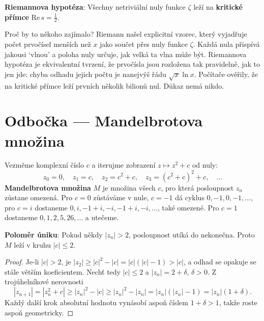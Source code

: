 \begin{definitionbox}
  \textbf{Riemannova hypotéza}: Všechny netriviální nuly funkce $\zeta$ leží na \textbf{kritické přímce} $\mathrm{Re}\,s = \frac{1}{2}$.
\end{definitionbox}

Proč by to někoho zajímalo? Riemann našel explicitní vzorec, který vyjadřuje počet prvočísel menších než $x$ jako součet přes nuly funkce $\zeta$. Každá nula přispívá jakousi `vlnou' a poloha nuly určuje, jak velká ta vlna může být. Riemannova hypotéza je ekvivalentní tvrzení, že prvočísla jsou rozložena tak pravidelně, jak to jen jde: chyba odhadu jejich počtu je nanejvýš řádu $\sqrt{x}\ln x$. Počítače ověřily, že na kritické přímce leží prvních několik bilionů nul. Důkaz nemá nikdo.

\section{Odbočka --- Mandelbrotova množina}

Vezměme komplexní číslo $c$ a iterujme zobrazení $z\mapsto z^2 + c$ od nuly:
\begin{equation*}
  z_0 = 0,\quad z_1 = c,\quad z_2 = c^2 + c,\quad z_3 = {(c^2 + c)}^2 + c,\quad\dots
\end{equation*}
\textbf{Mandelbrotova množina} $M$ je množina všech $c$, pro která posloupnost $z_n$ zůstane omezená. Pro $c = 0$ zůstáváme v nule, $c = -1$ dá cyklus $0, -1, 0, -1, \dots$, pro $c = i$ dostaneme $0, i, -1 + i, -i, -1 + i, -i, \dots$, také omezené. Pro $c = 1$ dostaneme $0, 1, 2, 5, 26, \dots$ a utečeme.

\begin{definitionbox}
  \textbf{Poloměr úniku}: Pokud někdy $|z_n| > 2$, posloupnost utíká do nekonečna. Proto $M$ leží v kruhu $|c|\leq 2$.
\end{definitionbox}

\begin{proof}
  Je-li $|c| > 2$, je $|z_2|\geq|c|^2 - |c| = |c|(|c| - 1) > |c|$, a odhad se opakuje se stále větším koeficientem. Nechť tedy $|c|\leq 2$ a $|z_n| = 2 + \delta$, $\delta > 0$. Z trojúhelníkové nerovnosti
  \begin{equation*}
    |z_{n+1}| = |z_n^2 + c|\geq|z_n|^2 - |c|\geq|z_n|^2 - |z_n| = |z_n|(|z_n| - 1) = |z_n|(1 + \delta).
  \end{equation*}
  Každý další krok absolutní hodnotu vynásobí aspoň číslem $1 + \delta > 1$, takže roste aspoň geometricky.
\end{proof}

